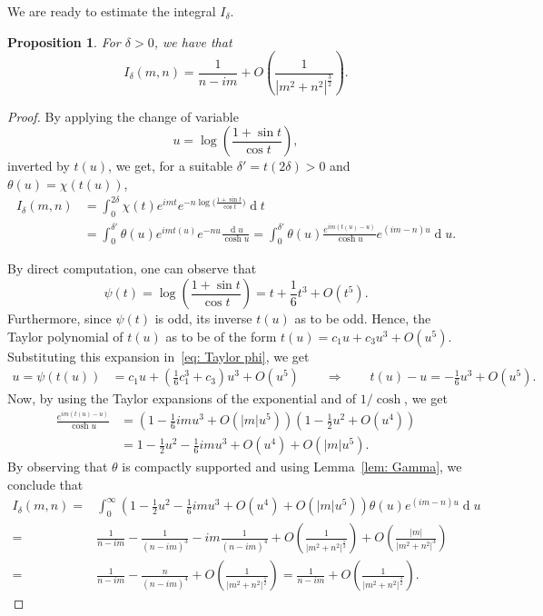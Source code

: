 \documentclass[12pt,a4paper,reqno]{amsart}
\newtheorem{prop}[thm]{Proposition}
\theoremstyle{definition}
\theoremstyle{definition}\newtheorem{defn}[thm]{Definition}
\begin{document}
    We are ready to estimate the integral $I_\delta$.
    \begin{prop}
        For $\delta>0$, we have that
    \[ I_\delta(m,n)=\frac 1{n-im}+ O \left(\frac 1{|m^2+n^2|^{\frac 32}}\right).\]
    \end{prop}
    \begin{proof}By applying the change of variable \[u=\log\left(\frac{1+\sin t}{\cos t}\right),\]
    inverted by $t(u)$, we get, for a suitable $\delta'=t(2\delta)>0$ and $\theta(u)=\chi(t(u))$,
    \begin{align*}
    I_\delta(m,n)&=\int_{0}^{2\delta}\chi(t) e^{imt} e^{-n\log\big(\frac{1+\sin t}{\cos t} \big)}\operatorname{d}\!t\\
        &=\int_{0}^{\delta'} \theta(u)e^{imt(u)} e^{-nu}\frac{\operatorname{d}\!u}{\cosh u}=\int_{0}^{\delta'} \theta(u)\frac{e^{im(t(u)-u)}}{\cosh u} e^{(im-n)u}\operatorname{d}\!u.
    \end{align*}
    
    By direct computation, one can observe that 
    \begin{equation}
        \label{eq: Taylor phi} \psi(t)=\log\left(\frac {1+\sin t}{\cos t}\right)=t+\frac 16 t^3+ O (t^5).
    \end{equation}
    Furthermore, since $\psi(t)$ is odd, its inverse $t(u)$ as to be odd. Hence, the Taylor polynomial of $t(u)$ as to be of the form $t(u)=c_1 u+c_3 u^3 + O (u^5)$.
    Substituting this expansion  in~\eqref{eq: Taylor phi}, we get
    \begin{align*}
        u=\psi(t(u))&=c_1 u+\left( \frac 16 c_1^3+c_3\right) u^3+ O (u^5)\qquad\Longrightarrow\qquad t(u)-u=-\frac 16 u^3 + O (u^5).
    \end{align*}
    Now, by using the Taylor expansions of the exponential and of $1/\cosh$,
    we get
    \begin{align*}
        \frac{e^{im(t(u)-u)}}{\cosh u}
        &=\left(1-\frac 16 im u^3 + O (|m|u^5)\right)\left(1-\frac 12 u^2+ O (u^4)\right)\\
        &=1-\frac 12 u^2-\frac 16 im u^3+ O (u^4)+ O (|m|u^5).
    \end{align*}  
    By observing that $\theta$ is compactly supported and using Lemma~\ref{lem: Gamma}, we conclude that
        \begin{align*}
            I_\delta(m,n)=&\int_{0}^{\infty} \left(1-\frac 12 u^2-\frac 16 im u^3+ O (u^4)+ O (|m|u^5)\right) \theta(u)e^{(im-n)u}\operatorname{d}\!u\\
            =&\frac 1{n-im}-\frac 1{(n-im)^3}-im \frac 1{(n-im)^4}+ O \left(\frac 1{|m^2+n^2|^{\frac 52}}\right)+ O \left(\frac {|m|}{|m^2+n^2|^3}\right)\\
            =&\frac 1{n-im}-\frac {n}{(n-im)^4}+ O \left(\frac 1{|m^2+n^2|^{\frac 52}}\right)=\frac 1{n-im}+ O \left(\frac 1{|m^2+n^2|^{\frac 32}}\right).
        \end{align*}
        \end{proof}
\end{document}
